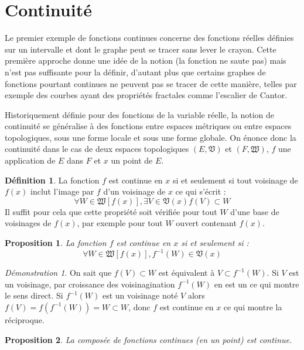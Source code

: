 \documentclass[a4paper, 11pt, french]{book}
\theoremstyle{plain} %
\newtheorem{proposition}{Proposition}
\theoremstyle{definition} %
\newtheorem{definition}{Définition}
\theoremstyle{remark} %
\newtheorem*{demonstration}{Démonstration}
\newcommand{\1}{\mathds{1}}
\newcommand{\inv}[1]{#1^{-1}}
\renewcommand{\frak}[1]{\mathfrak{#1}}
\begin{document}
\section{Continuité}

Le premier exemple de fonctions continues concerne des fonctions réelles définies sur un intervalle et dont le graphe peut se tracer sans lever le crayon.
Cette première approche donne une idée de la notion (la fonction ne saute pas) mais n'est pas suffisante pour la définir, d'autant plus que certains graphes de fonctions pourtant continues ne peuvent pas se tracer de cette manière, telles par exemple des courbes ayant des propriétés fractales comme l'escalier de Cantor.

Historiquement définie pour des fonctions de la variable réelle, la notion de continuité se généralise à des fonctions entre espaces métriques ou entre espaces topologiques, sous une forme locale et sous une forme globale.
On énonce donc la continuité dans le cas de deux espaces topologiques $(E, \frak{V})$ et $(F, \frak{W})$, $f$ une application de $E$ dans $F$ et $x$ un point de $E$.

\begin{definition}
	La fonction $f$ est continue en $x$ si et seulement si tout voisinage de $f(x)$ inclut l'image par $f$ d'un voisinage de $x$ ce qui s'écrit :
	$$
	\forall W\in\frak{W}[f(x)], \exists V\in\frak{V}(x) f(V)\subset W
	$$
	Il suffit pour cela que cette propriété soit vérifiée pour tout $W$ d'une base de voisinages de $f(x)$, par exemple pour tout $W$ ouvert contenant $f(x)$. 
\end{definition}

\begin{proposition}
	La fonction $f$ est continue en $x$ si et seulement si :
	$$
	\forall W\in\frak{W}[f(x)], \inv{f}(W)\in\frak{V}(x)
	$$
\end{proposition}

\begin{demonstration}
	On sait que $f(V)\subset W$ est équivalent à $V\subset\inv{f}(W)$.
	Si $V$ est un voisinage, par croissance des voisinagination $\inv{f}(W)$ en est un ce qui montre le sens direct.
	Si $\inv{f}(W)$ est un voisinage noté $V$ alors $f(V)=f(\inv{f}(W))=W\subset W$, donc $f$ est continue en $x$ ce qui montre la réciproque.
\end{demonstration}

\begin{proposition}
	La composée de fonctions continues (en un point) est continue.
\end{proposition}
\end{document}

